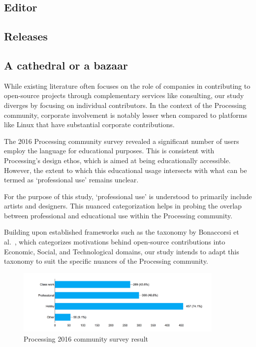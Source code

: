 \subsection{Editor}
\subsection{Releases}
\subsection{A cathedral or a bazaar}

While existing literature often focuses on the role of companies in contributing to open-source projects through complementary services like consulting, our study diverges by focusing on individual contributors. In the context of the Processing community, corporate involvement is notably lesser when compared to platforms like Linux that have substantial corporate contributions.

The 2016 Processing community survey revealed a significant number of users employ the language for educational purposes. This is consistent with Processing's design ethos, which is aimed at being educationally accessible. However, the extent to which this educational usage intersects with what can be termed as `professional use' remains unclear.

For the purpose of this study, `professional use' is understood to primarily include artists and designers. This nuanced categorization helps in probing the overlap between professional and educational use within the Processing community.

Building upon established frameworks such as the taxonomy by Bonaccorsi et al.~\cite{bonaccorsiComparingMotivationsIndividual2006}, which categorizes motivations behind open-source contributions into Economic, Social, and Technological domains, our study intends to adapt this taxonomy to suit the specific nuances of the Processing community.

\begin{figure}[h!] 
  \centering
  \includegraphics[width=0.9\textwidth]{images/community-survey.png} 
  \caption{Processing 2016 community survey result \parencite{2016CommunitySurvey}}
  \label{fig:community_survey}
\end{figure}


